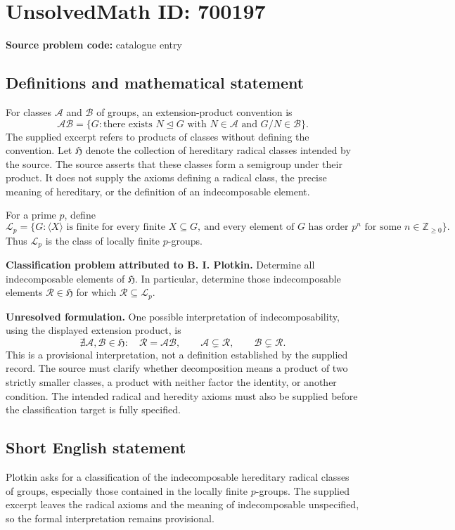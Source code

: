 \documentclass[11pt]{article}
\newcommand{\Z}{\mathbb{Z}}
\begin{document}
\section*{UnsolvedMath ID: 700197}
\textbf{Source problem code:} catalogue entry
\subsection{Definitions and mathematical statement}
For classes \(\mathcal A\) and \(\mathcal B\) of groups, an extension-product convention is
\[
\mathcal A\mathcal B=\{G:\text{there exists }N\trianglelefteq G\text{ with }N\in\mathcal A\text{ and }G/N\in\mathcal B\}.
\]
The supplied excerpt refers to products of classes without defining the convention. Let \(\mathfrak H\) denote the collection of hereditary radical classes intended by the source. The source asserts that these classes form a semigroup under their product. It does not supply the axioms defining a radical class, the precise meaning of hereditary, or the definition of an indecomposable element.

For a prime \(p\), define
\[
\mathcal L_p=\{G:\langle X\rangle\text{ is finite for every finite }X\subseteq G,\ \text{and every element of }G\text{ has order }p^n\text{ for some }n\in\Z_{\geq0}\}.
\]
Thus \(\mathcal L_p\) is the class of locally finite \(p\)-groups.

\textbf{Classification problem attributed to B. I. Plotkin.} Determine all indecomposable elements of \(\mathfrak H\). In particular, determine those indecomposable elements \(\mathcal R\in\mathfrak H\) for which \(\mathcal R\subseteq\mathcal L_p\).

\textbf{Unresolved formulation.} One possible interpretation of indecomposability, using the displayed extension product, is
\[
\nexists\mathcal A,\mathcal B\in\mathfrak H:\quad
\mathcal R=\mathcal A\mathcal B,\qquad
\mathcal A\subsetneq\mathcal R,\qquad
\mathcal B\subsetneq\mathcal R.
\]
This is a provisional interpretation, not a definition established by the supplied record. The source must clarify whether decomposition means a product of two strictly smaller classes, a product with neither factor the identity, or another condition. The intended radical and heredity axioms must also be supplied before the classification target is fully specified.
\subsection{Short English statement}
Plotkin asks for a classification of the indecomposable hereditary radical classes of groups, especially those contained in the locally finite \(p\)-groups. The supplied excerpt leaves the radical axioms and the meaning of indecomposable unspecified, so the formal interpretation remains provisional.
\end{document}
